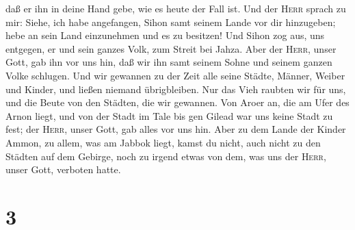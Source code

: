 daß er ihn in deine Hand gebe, wie es heute der Fall ist.
 Und der \textsc{Herr} sprach zu mir: Siehe, ich habe
angefangen, Sihon samt seinem Lande vor dir hinzugeben; hebe an sein
Land einzunehmen und es zu besitzen!  Und Sihon zog aus,
uns entgegen, er und sein ganzes Volk, zum Streit bei Jahza.
 Aber der \textsc{Herr}, unser Gott, gab ihn vor uns hin,
daß wir ihn samt seinem Sohne und seinem ganzen Volke schlugen.
 Und wir gewannen zu der Zeit alle seine Städte, Männer,
Weiber und Kinder, und ließen niemand übrigbleiben.  Nur
das Vieh raubten wir für uns, und die Beute von den Städten, die wir
gewannen.  Von Aroer an, die am Ufer des Arnon liegt, und
von der Stadt im Tale bis gen Gilead war uns keine Stadt zu fest; der
\textsc{Herr}, unser Gott, gab alles vor uns hin.  Aber
zu dem Lande der Kinder Ammon, zu allem, was am Jabbok liegt, kamst du
nicht, auch nicht zu den Städten auf dem Gebirge, noch zu irgend etwas
von dem, was uns der \textsc{Herr}, unser Gott, verboten hatte.

\hypertarget{section-2}{%
\section{3}\label{section-2}}

